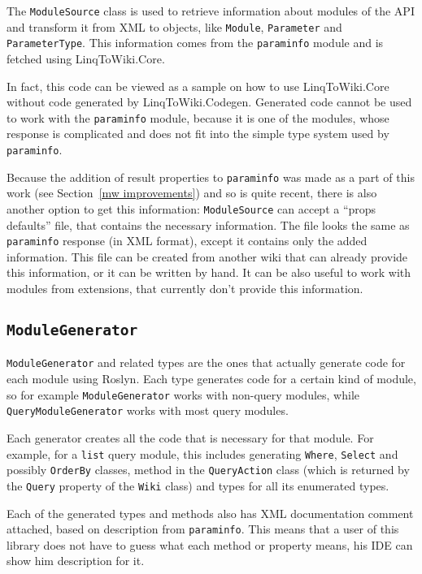 The \lstinline{ModuleSource} class is used to retrieve information about modules of the \ac{API}
and transform it from \acs{XML} to objects, like \lstinline{Module}, \lstinline{Parameter} and \lstinline{Parameter}\lstBreak\lstinline{Type}.
This information comes from the \texttt{paraminfo} module and is fetched using LinqToWiki.Core.

In fact, this code can be viewed as a sample on how to use LinqToWiki.Core
without code generated by LinqToWiki.Codegen.
Generated code cannot be used to work with the \texttt{paraminfo} module,
because it is one of the modules, whose response is complicated
and does not fit into the simple type system used by \texttt{paraminfo}.

Because the addition of result properties to \texttt{paraminfo} was made as a part of this work
(see Section~\ref{mw improvements}) and so is quite recent, there is also another option to get this information:
\lstinline{ModuleSource} can accept a “props defaults” file, that contains the necessary information.
The file looks the same as \texttt{paraminfo} response (in XML format),
except it contains only the added information.
This file can be created from another wiki that can already provide this information,
or it can be written by hand.
It can be also useful to work with modules from extensions, that currently don't provide this information.

\subsection{\texorpdfstring{\lstinline{ModuleGenerator}}{ModuleGenerator}}

\lstinline{ModuleGenerator} and related types are the ones that actually generate code for each module using Roslyn.
Each type generates code for a certain kind of module,
so for example \lstinline{ModuleGenerator} works with non-query modules,
while \lstinline{QueryModuleGenerator} works with most query modules.

Each generator creates all the code that is necessary for that module.
For example, for a \texttt{list} query module,
this includes generating \lstinline{Where}, \lstinline{Select} and possibly \lstinline{OrderBy} classes,
method in the \lstinline{QueryAction} class
(which is returned by the \lstinline{Query} property of the \lstinline{Wiki} class)
and types for all its enumerated types.

Each of the generated types and methods also has \acs{XML} documentation comment attached,
based on description from \texttt{paraminfo}.
This means that a user of this library does not have to guess what each method or property means,
his \ac{IDE} can show him description for it.

